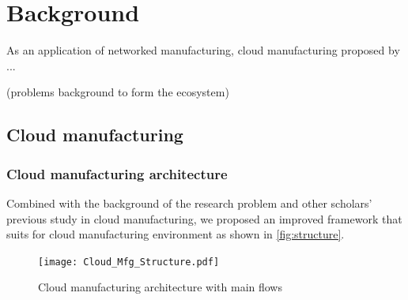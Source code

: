 \section{Background} %
\label{sec:background}

As an application of networked manufacturing, cloud manufacturing proposed by ...

(problems background to form the ecosystem)

\subsection{Cloud manufacturing} %
\label{sub:cloud_manufacturing}

\subsubsection{Cloud manufacturing architecture}

Combined with the background of the research problem and other scholars' previous study in cloud manufacturing, we proposed an improved framework that suits for cloud manufacturing environment as shown in \autoref{fig:structure}.
\begin{figure}[htbp]
\centering
\texttt{[image: Cloud\_Mfg\_Structure.pdf]}
\caption{Cloud manufacturing architecture with main flows}
\label{fig:structure}
\end{figure}

